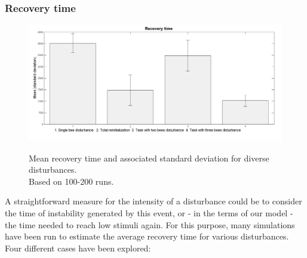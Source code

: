 \subsubsection{Recovery time}


\begin{center}
\begin{figure}[ht!]
\begin{centering}
\includegraphics[scale=0.35]{figures/Figure3}
\label{fig:figure5}
\par\end{centering}

\caption{Mean recovery time and associated standard deviation for diverse disturbances. \\\hspace{\textwidth}  Based on 100-200 runs.}


\end{figure}

\par\end{center}

A straightforward measure for the intensity of a disturbance could
be to consider the time of instability generated by this event, or
- in the terms of our model - the time needed to reach low stimuli
again. For this purpose, many simulations have been run to estimate
the average recovery time for various disturbances. Four different
cases have been explored:

